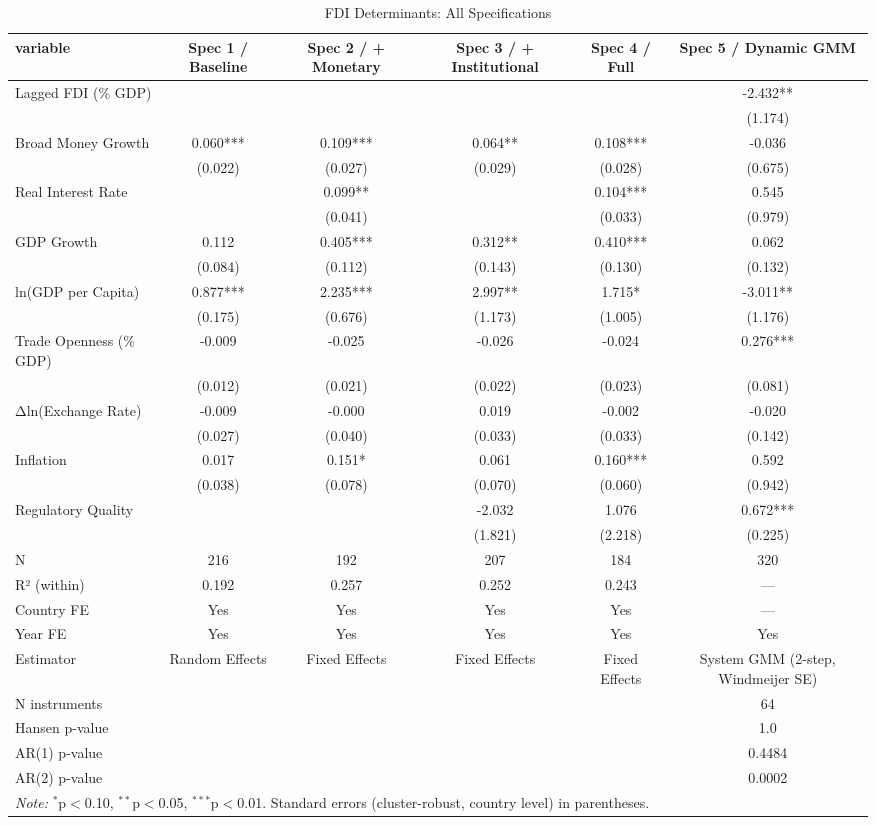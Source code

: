 \begin{table}[htbp]
\centering
\caption{FDI Determinants: All Specifications}
\label{tab:regression_all_specs}
\begin{tabular}{lccccc}
\hline\hline
variable & Spec 1 / Baseline & Spec 2 / + Monetary & Spec 3 / + Institutional & Spec 4 / Full & Spec 5 / Dynamic GMM \\
\hline
Lagged FDI (\% GDP) &  &  &  &  & -2.432** \\
 &  &  &  &  & (1.174) \\
Broad Money Growth & 0.060*** & 0.109*** & 0.064** & 0.108*** & -0.036 \\
 & (0.022) & (0.027) & (0.029) & (0.028) & (0.675) \\
Real Interest Rate &  & 0.099** &  & 0.104*** & 0.545 \\
 &  & (0.041) &  & (0.033) & (0.979) \\
GDP Growth & 0.112 & 0.405*** & 0.312** & 0.410*** & 0.062 \\
 & (0.084) & (0.112) & (0.143) & (0.130) & (0.132) \\
ln(GDP per Capita) & 0.877*** & 2.235*** & 2.997** & 1.715* & -3.011** \\
 & (0.175) & (0.676) & (1.173) & (1.005) & (1.176) \\
Trade Openness (\% GDP) & -0.009 & -0.025 & -0.026 & -0.024 & 0.276*** \\
 & (0.012) & (0.021) & (0.022) & (0.023) & (0.081) \\
Δln(Exchange Rate) & -0.009 & -0.000 & 0.019 & -0.002 & -0.020 \\
 & (0.027) & (0.040) & (0.033) & (0.033) & (0.142) \\
Inflation & 0.017 & 0.151* & 0.061 & 0.160*** & 0.592 \\
 & (0.038) & (0.078) & (0.070) & (0.060) & (0.942) \\
Regulatory Quality &  &  & -2.032 & 1.076 & 0.672*** \\
 &  &  & (1.821) & (2.218) & (0.225) \\
\hline
N & 216 & 192 & 207 & 184 & 320 \\
R² (within) & 0.192 & 0.257 & 0.252 & 0.243 & — \\
Country FE & Yes & Yes & Yes & Yes & — \\
Year FE & Yes & Yes & Yes & Yes & Yes \\
Estimator & Random Effects & Fixed Effects & Fixed Effects & Fixed Effects & System GMM (2-step, Windmeijer SE) \\
N instruments &  &  &  &  & 64 \\
Hansen p-value &  &  &  &  & 1.0 \\
AR(1) p-value &  &  &  &  & 0.4484 \\
AR(2) p-value &  &  &  &  & 0.0002 \\
\hline\hline
\multicolumn{6}{l}{\textit{Note:} $^{*}$p$<$0.10, $^{**}$p$<$0.05, $^{***}$p$<$0.01. Standard errors (cluster-robust, country level) in parentheses.}
\end{tabular}
\end{table}